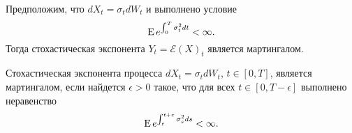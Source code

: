 \begin{proposition}
\label{stochexp:novikov}
Предположим, что $d X_t = \sigma_t dW_t$ и выполнено условие 
\[
\operatorname{E} e^{\int_0^T \sigma_t^2 dt} < \infty.
\]
Тогда стохастическая экспонента $Y_t = \mathcal{E}(X)_t$ является мартингалом.
\end{proposition}

\begin{corollary}
\label{stochexp:novikov-corollary}
Стохастическая экспонента процесса $d X_t = \sigma_t dW_t$, $t\in[0,T]$, является мартингалом, если найдется $\epsilon>0$ такое, что для всех $t\in[0,T-\epsilon]$ выполнено неравенство
\[
\operatorname{E} e^{\int_t^{t+\varepsilon} \sigma_s^2 ds} < \infty.
\]  
\end{corollary}
